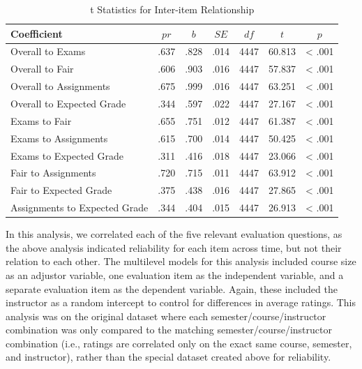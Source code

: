 \documentclass[man]{apa6}
\theoremstyle{definition}
\theoremstyle{definition}
\theoremstyle{definition}
\theoremstyle{remark}
\begin{document}
\begin{table}[tbp]
\begin{center}
\begin{threeparttable}
\caption{\label{tab:correlation-table}t Statistics for Inter-item Relationship}
\begin{tabular}{lcccccc}
\toprule
Coefficient & $pr$ & $b$ & $SE$ & $df$ & $t$ & $p$\\
\midrule
Overall to Exams & .637 & .828 & .014 & 4447 & 60.813 & < .001\\
Overall to Fair & .606 & .903 & .016 & 4447 & 57.837 & < .001\\
Overall to Assignments & .675 & .999 & .016 & 4447 & 63.251 & < .001\\
Overall to Expected Grade & .344 & .597 & .022 & 4447 & 27.167 & < .001\\
Exams to Fair & .655 & .751 & .012 & 4447 & 61.387 & < .001\\
Exams to Assignments & .615 & .700 & .014 & 4447 & 50.425 & < .001\\
Exams to Expected Grade & .311 & .416 & .018 & 4447 & 23.066 & < .001\\
Fair to Assignments & .720 & .715 & .011 & 4447 & 63.912 & < .001\\
Fair to Expected Grade & .375 & .438 & .016 & 4447 & 27.865 & < .001\\
Assignments to Expected Grade & .344 & .404 & .015 & 4447 & 26.913 & < .001\\
\bottomrule
\end{tabular}
\end{threeparttable}
\end{center}
\end{table}

In this analysis, we correlated each of the five relevant evaluation
questions, as the above analysis indicated reliability for each item
across time, but not their relation to each other. The multilevel models
for this analysis included course size as an adjustor variable, one
evaluation item as the independent variable, and a separate evaluation
item as the dependent variable. Again, these included the instructor as
a random intercept to control for differences in average ratings. This
analysis was on the original dataset where each
semester/course/instructor combination was only compared to the matching
semester/course/instructor combination (i.e., ratings are correlated
only on the exact same course, semester, and instructor), rather than
the special dataset created above for reliability.
\end{document}
